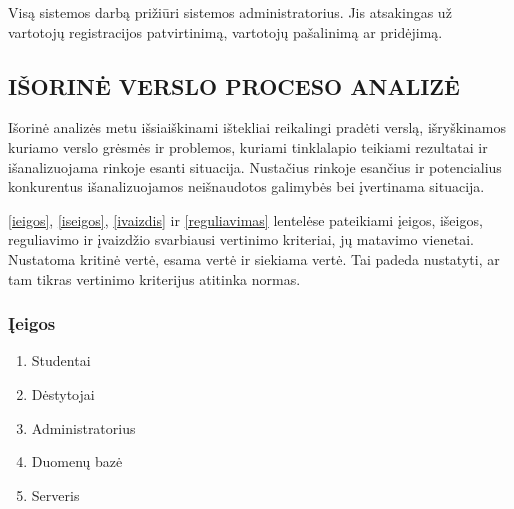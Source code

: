 \documentclass{VUMIFPSkursinis}
\begin{document}
Visą sistemos darbą prižiūri sistemos administratorius. Jis atsakingas už vartotojų registracijos patvirtinimą, vartotojų pašalinimą ar pridėjimą.

\newpage
\subsection{IŠORINĖ VERSLO PROCESO ANALIZĖ}
Išorinė analizės metu išsiaiškinami ištekliai
reikalingi pradėti verslą, išryškinamos kuriamo verslo grėsmės ir
problemos, kuriami tinklalapio teikiami rezultatai ir išanalizuojama rinkoje esanti situacija. Nustačius rinkoje esančius ir potencialius konkurentus išanalizuojamos
neišnaudotos galimybės bei įvertinama situacija.

\ref{ieigos}, \ref{iseigos}, \ref{ivaizdis} ir \ref{reguliavimas} lentelėse pateikiami įeigos, išeigos, reguliavimo ir įvaizdžio svarbiausi vertinimo kriteriai,
jų matavimo vienetai. Nustatoma kritinė vertė, esama vertė ir siekiama vertė. Tai padeda
nustatyti, ar tam tikras vertinimo kriterijus atitinka normas.
\subsubsection{Įeigos}
\begin{enumerate}
	\item Studentai
	\item Dėstytojai
	\item Administratorius
	\item Duomenų bazė
	\item Serveris
\end{enumerate}
\begin{table}[H]
	\centering
	\caption{Įeigos}
	\label{ieigos}
\end{table}
\end{document}
